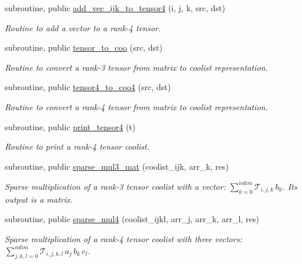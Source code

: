 \begin{DoxyCompactItemize}
subroutine, public \hyperlink{namespacetensor_adfadc0660ec0e87b9d0dd3c383919d6b}{add\+\_\+vec\+\_\+ijk\+\_\+to\+\_\+tensor4} (i, j, k, src, dst)
\begin{DoxyCompactList}\small\item\em Routine to add a vector to a rank-\/4 tensor. \end{DoxyCompactList}\item 
subroutine, public \hyperlink{namespacetensor_a39f5944ef78c2d2aaac59477d8c6848f}{tensor\+\_\+to\+\_\+coo} (src, dst)
\begin{DoxyCompactList}\small\item\em Routine to convert a rank-\/3 tensor from matrix to coolist representation. \end{DoxyCompactList}\item 
subroutine, public \hyperlink{namespacetensor_ae8308730212d86ee401775f02f631310}{tensor4\+\_\+to\+\_\+coo4} (src, dst)
\begin{DoxyCompactList}\small\item\em Routine to convert a rank-\/4 tensor from matrix to coolist representation. \end{DoxyCompactList}\item 
subroutine, public \hyperlink{namespacetensor_acb57d076f51b89419e4e8254ce13dd62}{print\+\_\+tensor4} (t)
\begin{DoxyCompactList}\small\item\em Routine to print a rank-\/4 tensor coolist. \end{DoxyCompactList}\item 
subroutine, public \hyperlink{namespacetensor_a08965e1040a94fc58c1efa9ff9639118}{sparse\+\_\+mul3\+\_\+mat} (coolist\+\_\+ijk, arr\+\_\+k, res)
\begin{DoxyCompactList}\small\item\em Sparse multiplication of a rank-\/3 tensor coolist with a vector\+: ${\displaystyle \sum_{k=0}^{ndim}} \mathcal{T}_{i,j,k} \, b_k$. Its output is a matrix. \end{DoxyCompactList}\item 
subroutine, public \hyperlink{namespacetensor_ab365e6dbb17e7fb26fef90649dd9e445}{sparse\+\_\+mul4} (coolist\+\_\+ijkl, arr\+\_\+j, arr\+\_\+k, arr\+\_\+l, res)
\begin{DoxyCompactList}\small\item\em Sparse multiplication of a rank-\/4 tensor coolist with three vectors\+: ${\displaystyle \sum_{j,k,l=0}^{ndim}} \mathcal{T}_{i,j,k,l} \, a_j \,b_k \, c_l $. \end{DoxyCompactList}\item 

\end{DoxyCompactItemize}
